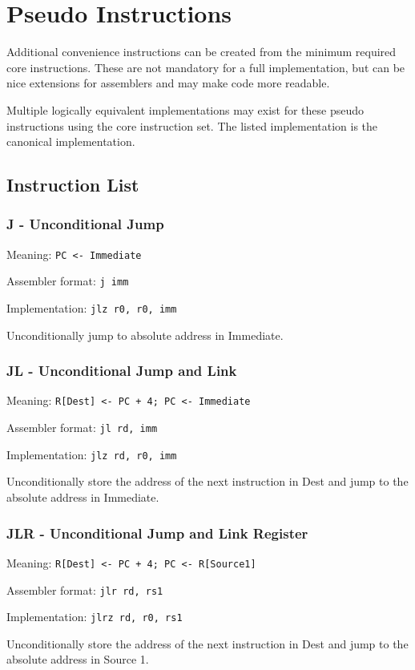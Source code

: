 \documentclass{article}
\begin{document}
\section{Pseudo Instructions}
Additional convenience instructions can be created from the minimum required core instructions.
These are not mandatory for a full implementation, but can be nice extensions for assemblers and
may make code more readable.

Multiple logically equivalent implementations may exist for these pseudo instructions using the
core instruction set. The listed implementation is the canonical implementation.

\subsection{Instruction List}

\subsubsection{J - Unconditional Jump}
Meaning: \verb|PC <- Immediate|

Assembler format: \verb|j imm|

Implementation: \verb|jlz r0, r0, imm|

Unconditionally jump to absolute address in Immediate.

\subsubsection{JL - Unconditional Jump and Link}
Meaning: \verb|R[Dest] <- PC + 4; PC <- Immediate|

Assembler format: \verb|jl rd, imm|

Implementation: \verb|jlz rd, r0, imm|

Unconditionally store the address of the next instruction in Dest and jump to the absolute
address in Immediate.

\subsubsection{JLR - Unconditional Jump and Link Register}
Meaning: \verb|R[Dest] <- PC + 4; PC <- R[Source1]|

Assembler format: \verb|jlr rd, rs1|

Implementation: \verb|jlrz rd, r0, rs1|

Unconditionally store the address of the next instruction in Dest and jump to the absolute
address in Source 1.
\end{document}
